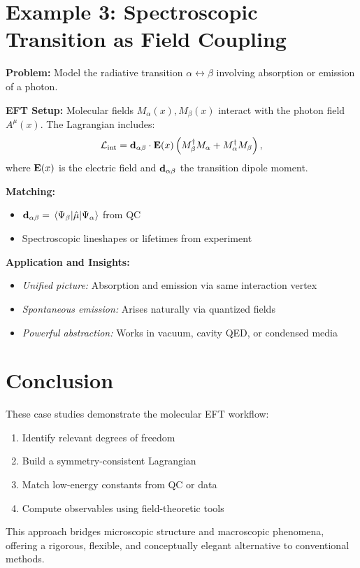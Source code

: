 \section{Example 3: Spectroscopic Transition as Field Coupling}
\label{sec:example_spectroscopy}

\textbf{Problem:} Model the radiative transition \(\alpha \leftrightarrow \beta\) involving absorption or emission of a photon.

\textbf{EFT Setup:} Molecular fields \(M_\alpha(x), M_\beta(x)\) interact with the photon field \(A^\mu(x)\). The Lagrangian includes:
\begin{equation}
\mathcal{L}_{\mathrm{int}} = \vb{d}_{\alpha\beta} \cdot \vb{E}(x) \left(M^\dagger_\beta M_\alpha + M^\dagger_\alpha M_\beta\right),
\end{equation}
where \(\vb{E}(x)\) is the electric field and \(\vb{d}_{\alpha\beta}\) the transition dipole moment.

\textbf{Matching:}
\begin{itemize}
  \item \(\vb{d}_{\alpha\beta} = \mel{\Psi_\beta}{\hat{\mu}}{\Psi_\alpha}\) from QC
  \item Spectroscopic lineshapes or lifetimes from experiment
\end{itemize}

\textbf{Application and Insights:}
\begin{itemize}
  \item \emph{Unified picture:} Absorption and emission via same interaction vertex
  \item \emph{Spontaneous emission:} Arises naturally via quantized fields
  \item \emph{Powerful abstraction:} Works in vacuum, cavity QED, or condensed media
\end{itemize}

\section*{Conclusion}

These case studies demonstrate the molecular EFT workflow:
\begin{enumerate}
  \item Identify relevant degrees of freedom
  \item Build a symmetry-consistent Lagrangian
  \item Match low-energy constants from QC or data
  \item Compute observables using field-theoretic tools
\end{enumerate}

This approach bridges microscopic structure and macroscopic phenomena, offering a rigorous, flexible, and conceptually elegant alternative to conventional methods.


